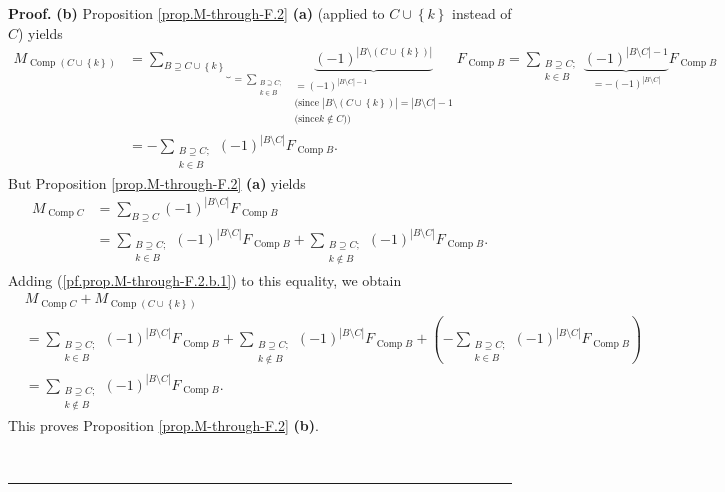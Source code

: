 \documentclass[numbers=enddot,12pt,final,onecolumn,notitlepage]{scrartcl}%
\theoremstyle{definition}
\newenvironment{proof}[1][Proof]{\noindent\textbf{#1.} }{\ \rule{0.5em}{0.5em}}
\newenvironment{verlong}{}{}
\let\sumnonlimits\sum
\renewcommand{\sum}{\sumnonlimits\limits}
\begin{document}
\begin{verlong}
\begin{proof}
\textbf{(b)} Proposition \ref{prop.M-through-F.2} \textbf{(a)} (applied to
$C\cup\left\{  k\right\}  $ instead of $C$) yields%
\begin{align}
M_{\operatorname*{Comp}\left(  C\cup\left\{  k\right\}  \right)  }  &
=\underbrace{\sum_{B\supseteq C\cup\left\{  k\right\}  }}_{=\sum
_{\substack{B\supseteq C;\\k\in B}}}\underbrace{\left(  -1\right)
^{\left\vert B\setminus\left(  C\cup\left\{  k\right\}  \right)  \right\vert
}}_{\substack{=\left(  -1\right)  ^{\left\vert B\setminus C\right\vert
-1}\\\text{(since }\left\vert B\setminus\left(  C\cup\left\{  k\right\}
\right)  \right\vert =\left\vert B\setminus C\right\vert -1\\\text{(since
}k\notin C\text{))}}}F_{\operatorname*{Comp}B}=\sum_{\substack{B\supseteq
C;\\k\in B}}\underbrace{\left(  -1\right)  ^{\left\vert B\setminus
C\right\vert -1}}_{=-\left(  -1\right)  ^{\left\vert B\setminus C\right\vert
}}F_{\operatorname*{Comp}B}\nonumber\\
&  =-\sum_{\substack{B\supseteq C;\\k\in B}}\left(  -1\right)  ^{\left\vert
B\setminus C\right\vert }F_{\operatorname*{Comp}B}.
\label{pf.prop.M-through-F.2.b.1}%
\end{align}
But Proposition \ref{prop.M-through-F.2} \textbf{(a)} yields
\begin{align*}
M_{\operatorname*{Comp}C}  &  =\sum_{B\supseteq C}\left(  -1\right)
^{\left\vert B\setminus C\right\vert }F_{\operatorname*{Comp}B}\\
&  =\sum_{\substack{B\supseteq C;\\k\in B}}\left(  -1\right)  ^{\left\vert
B\setminus C\right\vert }F_{\operatorname*{Comp}B}+\sum_{\substack{B\supseteq
C;\\k\notin B}}\left(  -1\right)  ^{\left\vert B\setminus C\right\vert
}F_{\operatorname*{Comp}B}.
\end{align*}
Adding (\ref{pf.prop.M-through-F.2.b.1}) to this equality, we obtain%
\begin{align*}
&  M_{\operatorname*{Comp}C}+M_{\operatorname*{Comp}\left(  C\cup\left\{
k\right\}  \right)  }\\
&  =\sum_{\substack{B\supseteq C;\\k\in B}}\left(  -1\right)  ^{\left\vert
B\setminus C\right\vert }F_{\operatorname*{Comp}B}+\sum_{\substack{B\supseteq
C;\\k\notin B}}\left(  -1\right)  ^{\left\vert B\setminus C\right\vert
}F_{\operatorname*{Comp}B}+\left(  -\sum_{\substack{B\supseteq C;\\k\in
B}}\left(  -1\right)  ^{\left\vert B\setminus C\right\vert }%
F_{\operatorname*{Comp}B}\right) \\
&  =\sum_{\substack{B\supseteq C;\\k\notin B}}\left(  -1\right)  ^{\left\vert
B\setminus C\right\vert }F_{\operatorname*{Comp}B}.
\end{align*}
This proves Proposition \ref{prop.M-through-F.2} \textbf{(b)}.


\end{proof}
\end{verlong}
\end{document}
